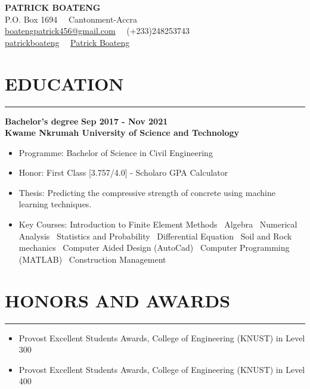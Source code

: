 \documentclass[letterpaper, 12pt]{article}
\newcommand{\cvsection}[1]{
	
	\section*{#1}	
	\rule[20pt]{\linewidth}{0.5pt} %

}
\newcommand{\verticalSpace}{4pt}
\newcommand{\itemizeMargin}{11pt}
\begin{document}
	
	
	\begin{center}
		
	{\huge{\textbf{PATRICK BOATENG}}} \\ [\verticalSpace]
	
	P.O. Box 1694 \, \vrule \, Cantonment-Accra \\ [\verticalSpace]
	
	\faEnvelope \space \href{mailto:boatengpatrick456@gmail.com}{\underline{boatengpatrick456@gmail.com}}
	\, \vrule \,
	\faPhone \space (+233)248253743 \\ [\verticalSpace]
	\faGithub \space \href{https://www.github.com/Pato546}{\underline{patrickboateng}}
	\, \vrule \,
	\faLinkedin \space \href{https://www.linkedin.com/in/patrickboateng}{\underline{Patrick Boateng}}
	
	\end{center}
	
	
	\cvsection{EDUCATION} 	
	
	\textbf{Bachelor's degree} \hfill \textbf{Sep 2017 - Nov 2021} \\ [\verticalSpace]
	\textbf{Kwame Nkrumah University of Science and Technology}
	
	\begin{itemize}[leftmargin=\itemizeMargin]
		
	\item Programme: Bachelor of Science in Civil Engineering
	\item Honor: First Class [3.757/4.0] - Scholaro GPA Calculator
	\item Thesis: Predicting the compressive strength of concrete using machine learning techniques.
	\item Key Courses: Introduction to Finite Element Methods \vrule \, Algebra \vrule \, Numerical Analysis \vrule \, Statistics and Probability \vrule \, Differential Equation \vrule \, Soil and Rock mechanics \vrule \, Computer Aided Design (AutoCad) \vrule \, Computer Programming (MATLAB) \vrule \, Construction Management
	
	\end{itemize}
	
	
	\cvsection{HONORS AND AWARDS}
	
	\begin{itemize}[leftmargin=\itemizeMargin]
		
		\item Provost Excellent Students Awards, College of Engineering (KNUST) in Level 300
		\item Provost Excellent Students Awards, College of Engineering (KNUST) in Level 400
		
	\end{itemize}
	
\end{document}
